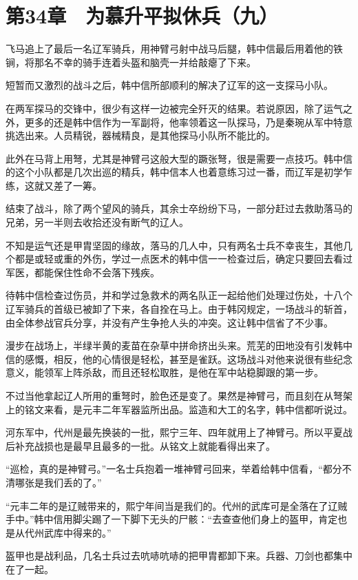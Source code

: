 \section{第34章　为慕升平拟休兵（九）}

飞马追上了最后一名辽军骑兵，用神臂弓射中战马后腿，韩中信最后用着他的铁锏，将那名不幸的骑手连着头盔和脑壳一并给敲瘪了下来。

短暂而又激烈的战斗之后，韩中信所部顺利的解决了辽军的这一支探马小队。

在两军探马的交锋中，很少有这样一边被完全歼灭的结果。若说原因，除了运气之外，更多的还是韩中信作为一军副将，他率领着这一队探马，乃是秦琬从军中特意挑选出来。人员精锐，器械精良，是其他探马小队所不能比的。

此外在马背上用弩，尤其是神臂弓这般大型的蹶张弩，很是需要一点技巧。韩中信的这个小队都是几次出巡的精兵，韩中信本人也着意练习过一番，而辽军是初学乍练，这就又差了一筹。

结束了战斗，除了两个望风的骑兵，其余士卒纷纷下马，一部分赶过去救助落马的兄弟，另一半则去收拾还没有断气的辽人。

不知是运气还是甲胄坚固的缘故，落马的几人中，只有两名士兵不幸丧生，其他几个都是或轻或重的外伤，学过一点医术的韩中信一一检查过后，确定只要回去看过军医，都能保住性命不会落下残疾。

待韩中信检查过伤员，并和学过急救术的两名队正一起给他们处理过伤处，十八个辽军骑兵的首级已被卸了下来，各自拴在马上。由于韩冈规定，一场战斗的斩首，由全体参战官兵分享，并没有产生争抢人头的冲突。这让韩中信省了不少事。

漫步在战场上，半绿半黄的麦苗在杂草中拼命挤出头来。荒芜的田地没有引发韩中信的感慨，相反，他的心情很是轻松，甚至是雀跃。这场战斗对他来说很有些纪念意义，能领军上阵杀敌，而且还轻松取胜，是他在军中站稳脚跟的第一步。

不过当他拿起辽人所用的重弩时，脸色还是变了。果然是神臂弓，而且刻在从弩架上的铭文来看，是元丰二年军器监所出品。监造和大工的名字，韩中信都听说过。

河东军中，代州是最先换装的一批，熙宁三年、四年就用上了神臂弓。所以平夏战后补充战损也是最早且最多的一批。从铭文上就能看得出来了。

“巡检，真的是神臂弓。”一名士兵抱着一堆神臂弓回来，举着给韩中信看，“都分不清哪张是我们丢的了。”

“元丰二年的是辽贼带来的，熙宁年间当是我们的。代州的武库可是全落在了辽贼手中。”韩中信用脚尖踢了一下脚下无头的尸骸：“去查查他们身上的盔甲，肯定也是从代州武库中得来的。”

盔甲也是战利品，几名士兵过去吭哧吭哧的把甲胄都卸下来。兵器、刀剑也都集中在了一起。


